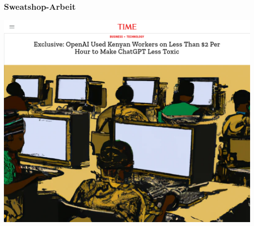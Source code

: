 \documentclass[aspectratio=169,usenames,dvipsnames]{beamer}
\begin{document}
\begin{frame}
\frametitle{Sweatshop-Arbeit}
\begin{center}
\includegraphics[height=0.8\textheight, keepaspectratio]{images/time_kenya}
\end{center}
\end{frame}
\end{document}
